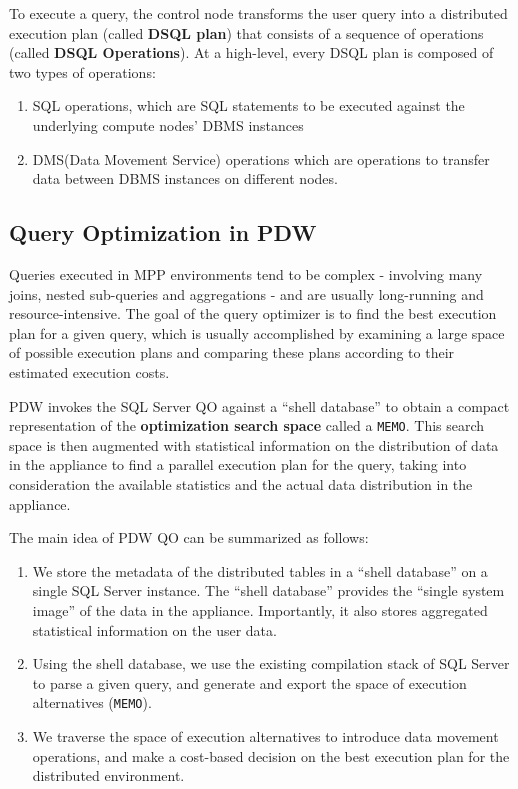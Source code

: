 \documentclass[11pt]{article}
\begin{document}
To execute a query, the control node transforms the user query into a distributed execution plan
(called \textbf{DSQL plan}) that consists of a sequence of operations (called \textbf{DSQL Operations}). At a
high-level, every DSQL plan is composed of two types of operations:
\begin{enumerate}
\item SQL operations, which are SQL statements to be executed against the underlying compute nodes’ DBMS
instances
\item DMS(Data Movement Service) operations which are operations to transfer data between DBMS instances
on different nodes.
\end{enumerate}
\subsection{Query Optimization in PDW}
\label{sec:orgd53579c}
Queries executed in MPP environments tend to be complex - involving many joins, nested sub-queries and
aggregations - and are usually long-running and resource-intensive. The goal of the query optimizer is
to find the best execution plan for a given query, which is usually accomplished by examining a large
space of possible execution plans and comparing these plans according to their estimated execution
costs.

PDW invokes the SQL Server QO against a “shell database” to obtain a compact representation of the
\textbf{optimization search space} called a \texttt{MEMO}. This search space is then augmented with statistical
information on the distribution of data in the appliance to find a parallel execution plan for the
query, taking into consideration the available statistics and the actual data distribution in the
appliance.

The main idea of PDW QO can be summarized as follows:
\begin{enumerate}
\item We store the metadata of the distributed tables in a “shell database” on a single SQL Server
instance. The “shell database” provides the “single system image” of the data in the appliance. Importantly, it also stores aggregated statistical information on the user data.
\item Using the shell database, we use the existing compilation stack of SQL Server to parse a given
query, and generate and export the space of execution alternatives (\texttt{MEMO}).
\item We traverse the space of execution alternatives to introduce data movement operations, and make a
cost-based decision on the best execution plan for the distributed environment.
\end{enumerate}
\end{document}
